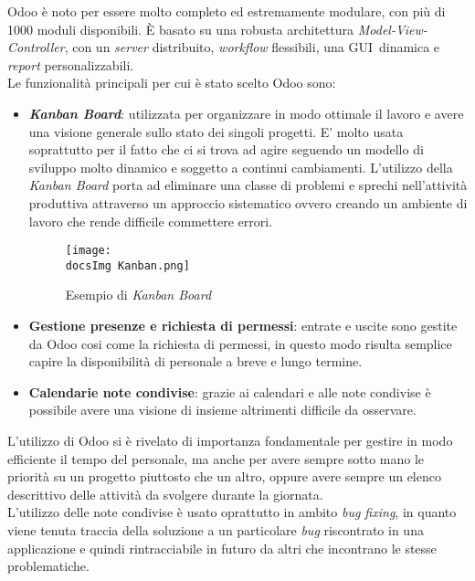 Odoo è noto per essere molto completo ed estremamente modulare, con più di 1000 moduli disponibili. È basato su una robusta architettura \textit{Model-View-Controller}, con un \textit{server} distribuito, \textit{workflow} flessibili, una GUI\gloss\ dinamica e \textit{report} personalizzabili.
\\
Le funzionalit\`a principali per cui \`e stato scelto Odoo sono:

\begin{itemize}
	\item \textbf{\textit{Kanban Board}}: utilizzata per organizzare in modo ottimale il lavoro e avere una visione generale sullo stato dei singoli progetti. E' molto usata soprattutto per il fatto che ci si trova ad agire seguendo un modello di sviluppo molto dinamico e soggetto a continui cambiamenti. L'utilizzo della \textit{Kanban Board} porta ad eliminare una classe di problemi e sprechi nell'attivit\`a produttiva attraverso un approccio sistematico ovvero creando un ambiente di lavoro che rende difficile commettere errori.
	
	\begin{figure}[H]
		\centering
		\texttt{[image: \\docsImg Kanban.png]}
		\caption{Esempio di \textit{Kanban Board}}
		\label{fig:Esempio di Kanban Board}
	\end{figure}
	
	\item \textbf{Gestione presenze e richiesta di permessi}: entrate e uscite sono gestite da Odoo cosi come la richiesta di permessi, in questo modo risulta semplice capire la disponibilit\`a di personale a breve e lungo termine.
	
	\item \textbf{Calendarie note condivise}: grazie ai calendari e alle note condivise \`e possibile avere una visione di insieme altrimenti difficile da osservare.	

\end{itemize}

L'utilizzo di Odoo si \`e rivelato di importanza fondamentale per gestire in modo efficiente il tempo del personale, ma anche per avere sempre sotto mano le priorit\`a su un progetto piuttosto che un altro, oppure avere sempre un elenco descrittivo delle attivit\`a da svolgere durante la giornata.
\\
L'utilizzo delle note condivise \`e usato oprattutto in ambito \textit{bug fixing}, in quanto viene tenuta traccia della soluzione a un particolare \textit{bug} riscontrato in una applicazione e quindi rintracciabile in futuro da altri che incontrano le stesse problematiche.

